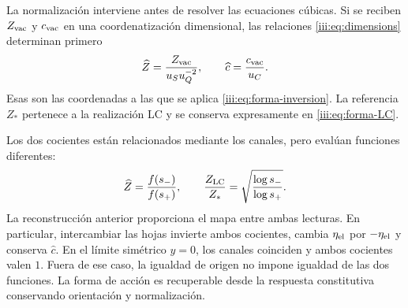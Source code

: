 La normalización interviene antes de resolver las ecuaciones cúbicas.
Si se reciben $Z_{\rm vac}$ y $c_{\rm vac}$ en una coordenatización dimensional,
las relaciones \eqref{iii:eq:dimensions} determinan primero
\[
 \widehat Z=\frac{Z_{\rm vac}}{u_Su_Q^{-2}},\qquad
 \widehat c=\frac{c_{\rm vac}}{u_C}.
\]
Esas son las coordenadas a las que se aplica
\eqref{iii:eq:forma-inversion}. La referencia $Z_*$ pertenece a la
realización LC y se conserva expresamente en \eqref{iii:eq:forma-LC}.

Los dos cocientes están relacionados mediante los canales, pero evalúan
funciones diferentes:
\begin{equation}
 \widehat Z=\frac{f(s_-)}{f(s_+)},\qquad
 \frac{Z_{\rm LC}}{Z_*}
       =\sqrt{\frac{\log s_-}{\log s_+}}.
 \label{iii:eq:forma-dos-cocientes}
\end{equation}
La reconstrucción anterior proporciona el mapa entre ambas lecturas.
En particular, intercambiar las hojas invierte ambos cocientes, cambia
$\eta_{\rm el}$ por $-\eta_{\rm el}$ y conserva $\widehat c$.
En el límite simétrico $y=0$, los canales coinciden y ambos cocientes
valen $1$. Fuera de ese caso, la igualdad de origen no impone igualdad
de las dos funciones. La forma de acción es recuperable desde la
respuesta constitutiva conservando orientación y normalización.
